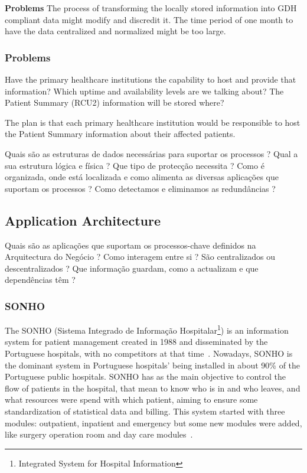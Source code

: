 \textbf{Problems}
The process of transforming the locally stored information into GDH compliant data might modify and discredit it.
The time period of one month to have the data centralized and normalized might be too large.

\subsubsection{Problems}
Have the primary healthcare institutions the capability to host and provide that information? Which uptime and availability levels are we talking about?
The Patient Summary (RCU2) information will be stored where?

The plan is that each primary healthcare institution would be responsible to host the Patient Summary information about their affected patients.

Quais são as estruturas de dados necessárias para suportar os processos ? Qual a sua estrutura lógica e física ? Que tipo de protecção necessita ? Como é organizada, onde está localizada e como alimenta as diversas aplicações que suportam os processos ? Como detectamos e eliminamos as redundâncias ?


\subsection{Application Architecture}


Quais são as aplicações que suportam os processos-chave definidos na Arquitectura do Negócio ? Como interagem entre si ? São centralizados ou descentralizados ? Que informação guardam, como a actualizam e que dependências têm ?

\subsubsection{SONHO}

The SONHO (Sistema Integrado de Informação Hospitalar\footnote{Integrated System for Hospital Information}) is an information system for patient management created in 1988 and disseminated by the Portuguese hospitals, with no competitors at that time~\citep{Teixeira2005}. Nowadays, SONHO is the dominant system in Portuguese hospitals' being installed in about 90\% of the Portuguese public hospitals. SONHO has as the main objective to control the flow of patients in the hospital, that mean to know who is in and who leaves, and what resources were spend with which patient, aiming to ensure some standardization of statistical data and billing. This system started with three modules: outpatient, inpatient and emergency but some new modules were added, like surgery operation room and day care modules~\citep{Cruz-correia}.

